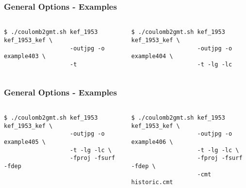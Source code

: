 \begin{frame}[t,fragile]
  \frametitle{General Options - Examples}
  \framesubtitle{}
  \label{ch4fr:ex403_4}
\begin{columns}[t]
  \begin{column}{.5\textwidth}
\begin{scriptsize}
\begin{verbatim}
$ ./coulomb2gmt.sh kef_1953 kef_1953_kef \
                   -outjpg -o example403 \
                   -t
\end{verbatim}
\end{scriptsize}
\centering
  \end{column}
  \begin{column}{.5\textwidth}
  \begin{scriptsize}
\begin{verbatim}
$ ./coulomb2gmt.sh kef_1953 kef_1953_kef \
                   -outjpg -o example404 \
                   -t -lg -lc
\end{verbatim}
\end{scriptsize}
\centering
  \end{column}
\end{columns}

\end{frame}
\note{}

\begin{frame}[t,fragile]
  \frametitle{General Options - Examples}
  \framesubtitle{}
  \label{ch4fr:405_6}
\begin{columns}[t]
  \begin{column}{.5\textwidth}
\begin{scriptsize}
\begin{verbatim}
$ ./coulomb2gmt.sh kef_1953 kef_1953_kef \
                   -outjpg -o example405 \
                   -t -lg -lc \
                   -fproj -fsurf -fdep
\end{verbatim}
\end{scriptsize}
\centering
  \end{column}
  \begin{column}{.5\textwidth}
  \begin{scriptsize}
\begin{verbatim}
$ ./coulomb2gmt.sh kef_1953 kef_1953_kef \
                   -outjpg -o example406 \
                   -t -lg -lc \
                   -fproj -fsurf -fdep \
                   -cmt historic.cmt
\end{verbatim}
\end{scriptsize}
\centering
  \end{column}
\end{columns}

\end{frame}
\note{}

